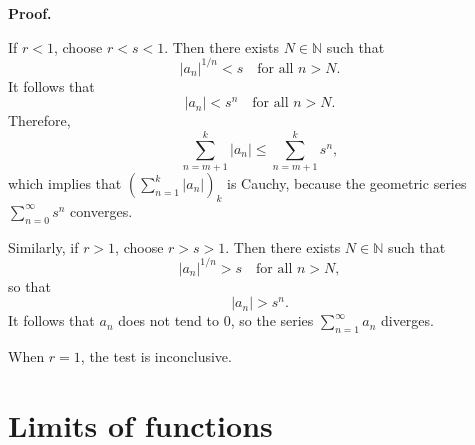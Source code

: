 \documentclass{article}
\begin{document}
\textbf{Proof.}

If \( r < 1 \), choose \( r < s < 1 \).  
Then there exists \( N \in \mathbb{N} \) such that
\[
|a_n|^{1/n} < s \quad \text{for all } n > N.
\]
It follows that
\[
|a_n| < s^n \quad \text{for all } n > N.
\]
Therefore,
\[
\sum_{n=m+1}^{k} |a_n| \le \sum_{n=m+1}^{k} s^n,
\]
which implies that \( \left( \sum_{n=1}^{k} |a_n| \right)_k \) is Cauchy,  
because the geometric series \( \sum_{n=0}^{\infty} s^n \) converges.

Similarly, if \( r > 1 \), choose \( r > s > 1 \).  
Then there exists \( N \in \mathbb{N} \) such that
\[
|a_n|^{1/n} > s \quad \text{for all } n > N,
\]
so that
\[
|a_n| > s^n.
\]
It follows that \( a_n \) does not tend to 0,  
so the series \( \sum_{n=1}^{\infty} a_n \) diverges.

When \( r = 1 \), the test is inconclusive.

\section{Limits of functions}
\end{document}
